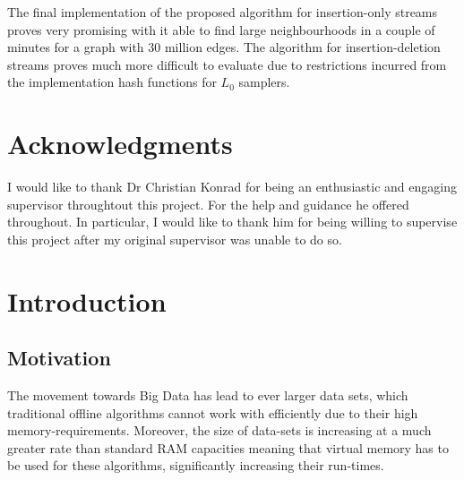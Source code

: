 \documentclass[11pt,twoside,a4paper]{report}
\begin{document}
\par The final implementation of the proposed algorithm for insertion-only streams proves very promising with it able to find large neighbourhoods in a couple of minutes for a graph with 30 million edges. The algorithm for insertion-deletion streams proves much more difficult to evaluate due to restrictions incurred from the implementation hash functions for $L_0$ samplers.

\chapter*{Acknowledgments}

I would like to thank Dr Christian Konrad for being an enthusiastic and engaging supervisor throughtout this project. For the help and guidance he offered throughout. In particular, I would like to thank him for being willing to supervise this project after my original supervisor was unable to do so.

\renewcommand\thechapter{\Roman{chapter}}
\renewcommand\thesection{\thechapter.\roman{section}}
\renewcommand\thesubsection{\thesection.\roman{subsection}}
\setcounter{chapter}{1}
\chapter*{Introduction}

\section{Motivation}


\par The movement towards Big Data has lead to ever larger data sets, which traditional offline algorithms cannot work with efficiently due to their high memory-requirements. Moreover, the size of data-sets is increasing at a much greater rate than standard RAM capacities meaning that virtual memory has to be used for these algorithms, significantly increasing their run-times.
\end{document}
